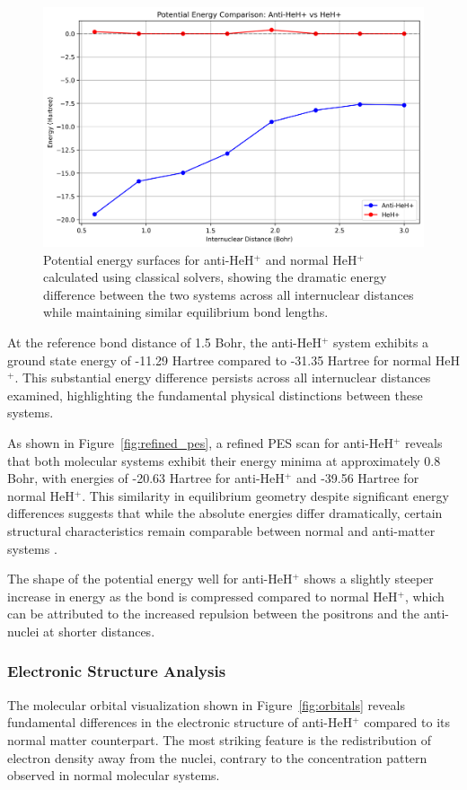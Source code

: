 \documentclass[10pt,twocolumn,a4paper]{article}
\begin{document}
\begin{figure}[t!]
    \centering
    \includegraphics[width=\columnwidth]{graphs/corrected_comparison_pes.png}
    \caption{Potential energy surfaces for anti-HeH$^+$ and normal HeH$^+$ calculated using classical solvers, showing the dramatic energy difference between the two systems across all internuclear distances while maintaining similar equilibrium bond lengths.}
    \label{fig:pes_comparison}
\end{figure}

At the reference bond distance of 1.5 Bohr, the anti-HeH$^+$ system exhibits a ground state energy of -11.29 Hartree compared to -31.35 Hartree for normal HeH$^+$. This substantial energy difference persists across all internuclear distances examined, highlighting the fundamental physical distinctions between these systems.

As shown in Figure~\ref{fig:refined_pes}, a refined PES scan for anti-HeH$^+$ reveals that both molecular systems exhibit their energy minima at approximately 0.8 Bohr, with energies of -20.63 Hartree for anti-HeH$^+$ and -39.56 Hartree for normal HeH$^+$. This similarity in equilibrium geometry despite significant energy differences suggests that while the absolute energies differ dramatically, certain structural characteristics remain comparable between normal and anti-matter systems \cite{chardonnet2021theoretical}.

The shape of the potential energy well for anti-HeH$^+$ shows a slightly steeper increase in energy as the bond is compressed compared to normal HeH$^+$, which can be attributed to the increased repulsion between the positrons and the anti-nuclei at shorter distances.

\subsubsection{Electronic Structure Analysis}
The molecular orbital visualization shown in Figure~\ref{fig:orbitals} reveals fundamental differences in the electronic structure of anti-HeH$^+$ compared to its normal matter counterpart. The most striking feature is the redistribution of electron density away from the nuclei, contrary to the concentration pattern observed in normal molecular systems.
\end{document}
